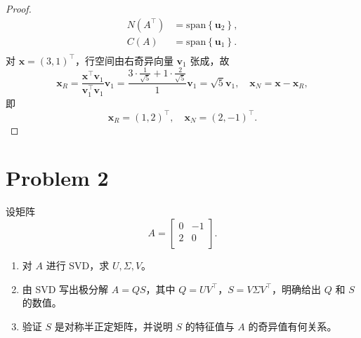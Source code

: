 \begin{proof}
\[\begin{aligned}
        N \left(A^\top\right) &= \mathrm{span} \left\{\boldsymbol{u}_2\right\}, \\
        C \left(A\right) &= \mathrm{span} \left\{\boldsymbol{u}_1\right\}. \\
    \end{aligned}
    \]
    对 $\boldsymbol{x} = \left(3, 1\right)^\top$，行空间由右奇异向量 $\boldsymbol v_1$ 张成，故
    \[
        \boldsymbol{x}_{R} = \frac{\boldsymbol{x}^\top \boldsymbol{v}_1}{\boldsymbol{v}_1^\top \boldsymbol{v}_1} \boldsymbol{v}_1 = \frac{3 \cdot \frac{1}{\sqrt{5}} + 1 \cdot \frac{2}{\sqrt{5}}}{1} \boldsymbol{v}_1 = \sqrt{5} \boldsymbol{v}_1, \quad \boldsymbol{x}_{N} = \boldsymbol{x} - \boldsymbol{x}_{R},
    \]
    即 \[
        \boldsymbol{x}_{R} = \left(1, 2\right)^\top, \quad \boldsymbol{x}_{N} = \left(2, -1\right)^\top.
    \]
\end{proof}

\section*{Problem 2}

设矩阵
\[
A =
\begin{bmatrix}
    0 & -1 \\
    2 & 0 \\
\end{bmatrix}.
\]
\begin{enumerate}
    \item 对 $A$ 进行 SVD，求 $U, \Sigma, V$。
    \item 由 SVD 写出极分解 $A = QS$，其中 $Q = UV^\top$，$S = V \Sigma V^\top$，明确给出 $Q$ 和 $S$ 的数值。
    \item 验证 $S$ 是对称半正定矩阵，并说明 $S$ 的特征值与 $A$ 的奇异值有何关系。
\end{enumerate}

